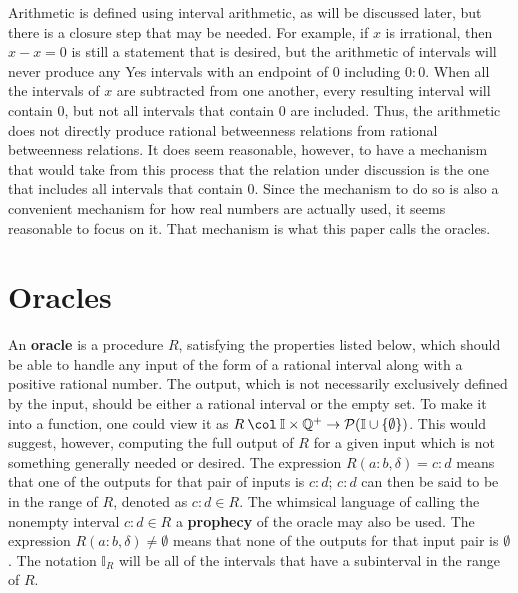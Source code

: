 \documentclass[12pt]{article}
\begin{document}
Arithmetic is defined using interval arithmetic, as will be discussed later, but there is a closure step that may be needed. For example, if $x$ is irrational, then $x - x = 0$ is still a statement that is desired, but the arithmetic of intervals will never produce any Yes intervals with an endpoint of $0$ including $0:0$. When all the intervals of $x$ are subtracted from one another, every resulting interval will contain 0, but not all intervals that contain 0 are included. Thus, the arithmetic does not directly produce rational betweenness relations from rational betweenness relations. It does seem reasonable, however, to have a mechanism that would take from this process that the relation under discussion is the one that includes all intervals that contain $0$. Since the mechanism to do so is also a convenient mechanism for how real numbers are actually used, it seems reasonable to focus on it. That mechanism is what this paper calls the oracles.  

\section{Oracles}

An \textbf{oracle} is a procedure $R$, satisfying the properties listed below, which should be able to handle any input of the form of a rational interval along with a positive rational number. The output, which is not necessarily exclusively defined by the input, should be either a rational interval or the empty set. To make it into a function, one could view it as $R \mathbin{\col} \mathbb{I} \times \mathbb{Q}^+ \to \mathcal{P}(\mathbb{I} \cup \{\emptyset\})$. This would suggest, however, computing the full output of $R$ for a given input which is not something generally needed or desired. The expression $R(a:b, \delta) = c:d$ means that one of the outputs for that pair of inputs is $c:d$; $c:d$ can then be said to be in the range of $R$, denoted as $c:d \in R$. The whimsical language of calling the nonempty interval $c:d \in R$ a \textbf{prophecy} of the oracle may also be used. The expression $R(a:b, \delta) \neq \emptyset$ means that none of the outputs for that input pair is $\emptyset$. The notation $\mathbb{I}_R$ will be all of the intervals that have a subinterval in the range of $R$. 
\end{document}
